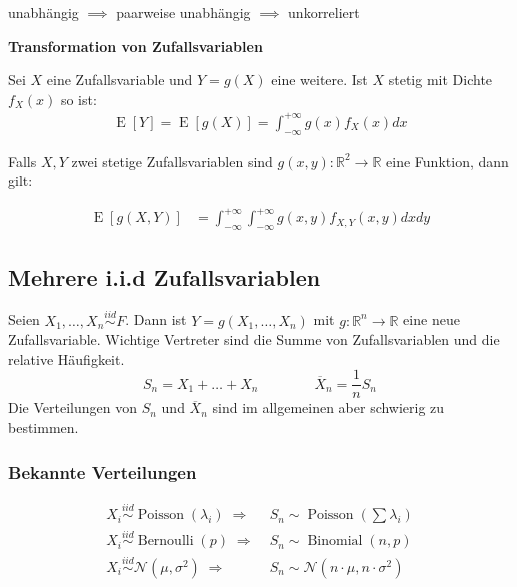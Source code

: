 \documentclass[25pt]{sciposter}
\newcommand{\R}{\mathbb{R}}
\newcommand{\E}{\operatorname{E}}
\newcommand{\mc}{\mathcal}
\newenvironment{thm}[1]{\begin{mdframed}[backgroundcolor=pink!20,innertopmargin=15pt, innerbottommargin=15pt, nobreak=true]
		\textbf{#1 }
	}
	{ 
	\end{mdframed}
}
\begin{document}
\begin{multicols}{3}
\begin{mdframed}
	\centering
	{unabhängig $\implies$ paarweise unabhängig $\implies$ unkorreliert}
\end{mdframed}


\begin{thm}{Transformation von Zufallsvariablen}
	Sei $X$ eine Zufallsvariable und $Y=g(X)$ eine weitere. Ist $X$ stetig mit Dichte $f_X(x)$ so ist:
	\begin{align*}
		\E[Y] = \E[g(X)] = \int_{-\infty}^{+\infty} g(x) f_X(x) dx
	\end{align*}
	
	Falls $X,Y$ zwei stetige Zufallsvariablen sind $g(x,y) : \R^2 \to \R$ eine Funktion, dann gilt:
	
	\begin{align*}
		\E[g(X,Y)] &= \int_{-\infty}^{+\infty} \int_{-\infty}^{+\infty} g(x,y) f_{X,Y}(x,y) dx dy
	\end{align*}
	
\end{thm}




\subsection*{Mehrere i.i.d Zufallsvariablen}

Seien $X_1,\ldots,X_n \overset{iid}{\sim} F$. Dann ist $Y=g(X_1,\ldots,X_n)$ mit $g: \R^n \longrightarrow \R$ eine neue Zufallsvariable.
Wichtige Vertreter sind die Summe von Zufallsvariablen und die relative Häufigkeit.
\[ S_n = X_1 + \ldots + X_n \qquad \qquad\overline{X}_n = \dfrac{1}{n} S_n \]
Die Verteilungen von $S_n$ und $\overline X_n$ sind im allgemeinen aber schwierig zu bestimmen.

\subsubsection*{Bekannte Verteilungen}
\begin{align*}
X_i \overset{iid}{\sim} \operatorname{Poisson}(\lambda_i) \; \Rightarrow & \; S_n \sim \operatorname{Poisson}({\textstyle \sum \lambda_i}) \\
X_i \overset{iid}{\sim} \operatorname{Bernoulli}(p) \; \Rightarrow & \; S_n \sim \operatorname{Binomial}(n,p)\\
X_i \overset{iid}{\sim} \mc N(\mu, \sigma^2) \; \Rightarrow & \; S_n \sim \mc N(n \cdot \mu, n \cdot \sigma^2)
\end{align*}

\end{multicols}
\end{document}
